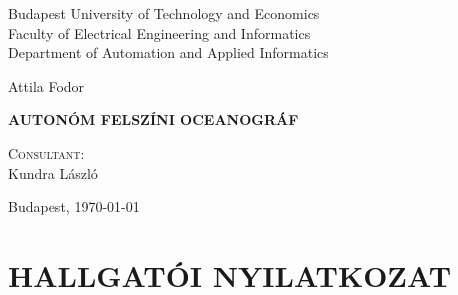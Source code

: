 \begin{center}

\begin{figure}[!h]
  \begin{center}
  \end{center}
\end{figure}

Budapest University of Technology and Economics \\
Faculty of Electrical Engineering and Informatics\\
{\small Department of Automation and Applied Informatics}

\thispagestyle{empty}

\pagestyle{empty}

\vspace{3.5cm}

\Large Attila Fodor

\vspace{0.8cm}

\textbf{\uppercase{\LARGE Autonóm felszíni oceanográf}}


\vfill

\textsc{Consultant:}\\ \Large Kundra László

\vspace{0.6cm}

\normalsize Budapest, \today

\end{center}

\clearpage


\iffalse

\chapter*{\uppercase{Hallgatói nyilatkozat}}

